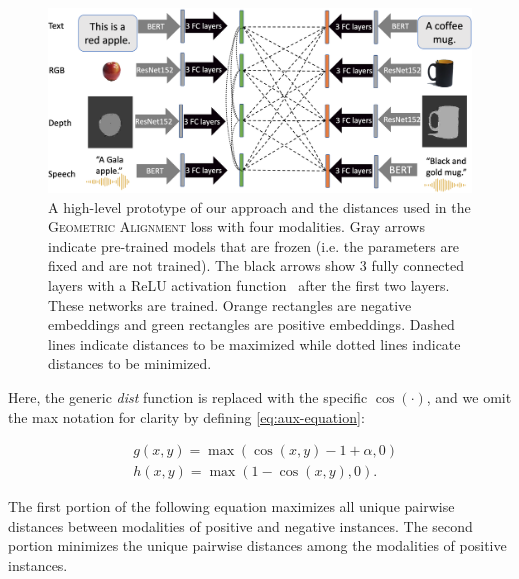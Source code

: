 \documentclass[sigconf,natbib=true,anonymous=true]{acmart}
\newcommand{\todocmi}[1]{\todo[inline,color=green!40]{\small #1 -- Cynthia}}
\newcommand{\geom}{\textsc{Geometric Alignment}}
\begin{document}
\begin{figure}[bt]
\centering
\includegraphics[width=1\columnwidth]{Figures/EMMA-Arch-Diagram.png}
\caption{A high-level prototype of our approach and the distances used in the \geom{} loss with four modalities. Gray arrows indicate pre-trained models that are frozen (i.e. the parameters are fixed and are not trained). The black arrows show 3 fully connected layers with a ReLU activation function~\citep{relu2010} after the first two layers. These networks are trained.
Orange rectangles are negative embeddings and green rectangles are positive embeddings.
Dashed lines indicate distances to be maximized while dotted lines indicate distances to be minimized.%
}
\label{fig:emma-loss-trimmed}
\end{figure}


Here, the generic \textit{dist} function is replaced with the specific $\cos(\cdot)$, and we omit the max notation for clarity by defining \cref{eq:aux-equation}:

\begin{equation}\label{eq:aux-equation}
    \begin{split}
        & g(x,y) = \max(\cos(x,y)-1 + \alpha, 0 ) \\
        & h(x,y) = \max(1- \cos(x,y), 0 ).
    \end{split}
\end{equation}


The first portion of the following equation maximizes all unique pairwise distances between modalities of positive and negative instances. The second portion minimizes the unique pairwise distances among the modalities of positive instances.
\end{document}
